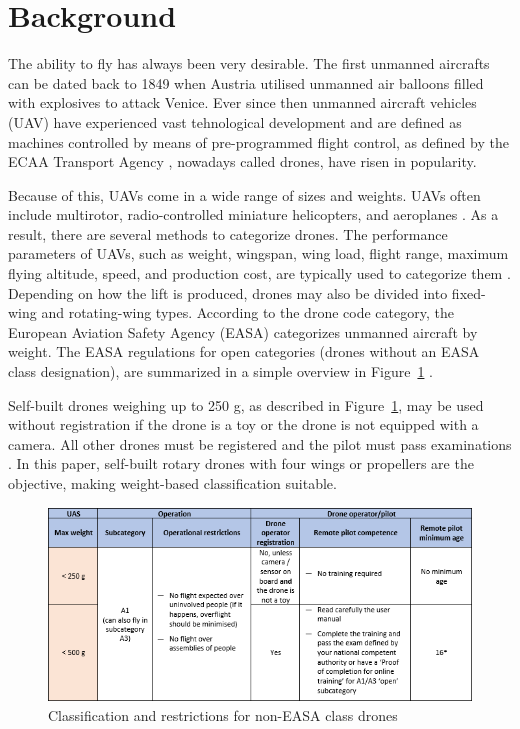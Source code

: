 \section{Background}

The ability to fly has always been very desirable. The first unmanned aircrafts can be dated back to 1849 when Austria utilised unmanned air balloons filled with explosives to attack Venice. \cite{Vyas2020}
Ever since then unmanned aircraft vehicles (UAV) have experienced vast tehnological development and are defined as machines controlled by means of pre-programmed flight control, as defined by the ECAA Transport Agency \cite{Droner}, nowadays called drones, have risen in popularity.

Because of this, UAVs come in a wide range of sizes and weights.
UAVs often include multirotor, radio-controlled miniature helicopters, and aeroplanes \cite{Ann2012}.
As a result, there are several methods to categorize drones. The performance parameters of UAVs, such as weight, wingspan, wing load, flight range, maximum flying altitude, speed, and production cost, are typically used to categorize them \cite{Hassanalian2017}.
Depending on how the lift is produced, drones may also be divided into fixed-wing and rotating-wing types.
According to the drone code category, the European Aviation Safety Agency (EASA) categorizes unmanned aircraft by weight.
The EASA regulations for open categories (drones without an EASA class designation), are summarized in a simple overview in Figure~\ref{fig:Table} \cite{Euasa}.

Self-built drones weighing up to 250 g, as described in Figure~\ref{fig:Table}, may be used without registration if the drone is a toy or the drone is not equipped with a camera. All other drones must be registered and the pilot must pass examinations \cite{Euasa}. In this paper, self-built rotary drones with four wings or propellers are the objective, making weight-based classification suitable.

\begin{figure}[H]
    \centering
    \includegraphics[scale = 0.9]{pictures/classification.PNG}
    \caption{Classification and restrictions for non-EASA class drones \cite{Euasa}}
    \label{fig:Table}
\end{figure}


